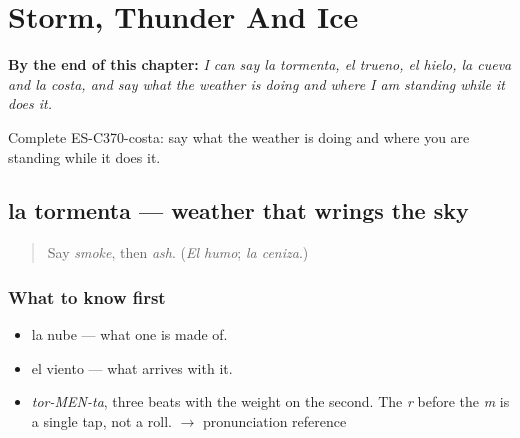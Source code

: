 
\chapter{Storm, Thunder And Ice}
\label{ch:la-tormenta-y-el-trueno}

\begin{chapteropening}
\textbf{By the end of this chapter:} \emph{I can say la tormenta, el trueno, el hielo, la cueva and la costa, and say what the weather is doing and where I am standing while it does it.}

Complete ES-C370-costa: say what the weather is doing and where you are standing while it does it.
\end{chapteropening}

\section[la tormenta]{la tormenta — weather that wrings the sky}

\label{lesson:ES-C370-tormenta}



\begin{quote}
Say \emph{smoke}, then \emph{ash}. (\emph{El humo}; \emph{la ceniza}.)
\end{quote}

\subsection*{What to know first}
\begin{itemize}
\raggedright
  \item la nube — what one is made of.
  \item el viento — what arrives with it.
\end{itemize}

\begin{sounds}
\begin{itemize}
\raggedright
  \item \emph{tor-MEN-ta}, three beats with the weight on the second. The \emph{r} before the \emph{m} is a single tap, not a roll. $\to$ pronunciation reference
\end{itemize}
\end{sounds}

